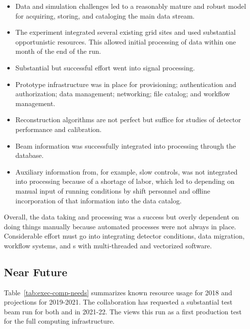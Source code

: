 \begin{itemize}
    \item Data and simulation challenges led to a reasonably mature and robust model for acquiring, storing, and cataloging the main data stream. 
    \item The experiment integrated several existing grid sites and used substantial opportunistic resources.  This allowed initial processing of data within one month of the end of the run.
    \item Substantial but successful effort went into signal processing. 
    \item Prototype infrastructure was in place for provisioning; authentication and authorization; data management; networking; file catalog; and workflow management. 
    \item Reconstruction algorithms are not perfect but suffice for studies of detector performance and calibration. 
    \item Beam information was successfully integrated into processing through the  database.
    \item Auxiliary information from, for example, slow controls, was not integrated into processing because of a shortage of labor, which led to depending on manual input of running conditions by shift personnel and offline incorporation of that information into the data catalog. 
\end{itemize}

Overall, the  data taking and processing was a success but overly dependent on doing things manually because automated processes were not always in place. Considerable effort must go into integrating detector conditions, data migration, workflow systems, and s with multi-threaded and vectorized software.

\subsection{Near Future}

Table~\ref{tab:exec-comp-needs} summarizes known resource usage for 2018 and projections for 2019-2021.  The collaboration has requested a substantial test beam run for both  and   in 2021-22.  The  views this run as a first production test for the full  computing infrastructure. 





